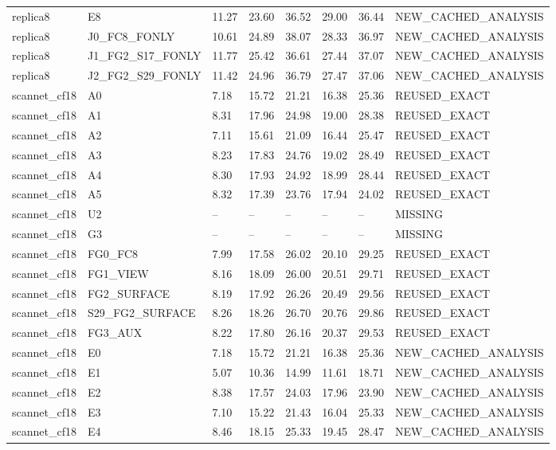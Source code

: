 \begin{tabular}{llllllll}
replica8 & E8 & 11.27 & 23.60 & 36.52 & 29.00 & 36.44 & NEW\_CACHED\_ANALYSIS \\
replica8 & J0\_FC8\_FONLY & 10.61 & 24.89 & 38.07 & 28.33 & 36.97 & NEW\_CACHED\_ANALYSIS \\
replica8 & J1\_FG2\_S17\_FONLY & 11.77 & 25.42 & 36.61 & 27.44 & 37.07 & NEW\_CACHED\_ANALYSIS \\
replica8 & J2\_FG2\_S29\_FONLY & 11.42 & 24.96 & 36.79 & 27.47 & 37.06 & NEW\_CACHED\_ANALYSIS \\
scannet\_cf18 & A0 & 7.18 & 15.72 & 21.21 & 16.38 & 25.36 & REUSED\_EXACT \\
scannet\_cf18 & A1 & 8.31 & 17.96 & 24.98 & 19.00 & 28.38 & REUSED\_EXACT \\
scannet\_cf18 & A2 & 7.11 & 15.61 & 21.09 & 16.44 & 25.47 & REUSED\_EXACT \\
scannet\_cf18 & A3 & 8.23 & 17.83 & 24.76 & 19.02 & 28.49 & REUSED\_EXACT \\
scannet\_cf18 & A4 & 8.30 & 17.93 & 24.92 & 18.99 & 28.44 & REUSED\_EXACT \\
scannet\_cf18 & A5 & 8.32 & 17.39 & 23.76 & 17.94 & 24.02 & REUSED\_EXACT \\
scannet\_cf18 & U2 & -- & -- & -- & -- & -- & MISSING \\
scannet\_cf18 & G3 & -- & -- & -- & -- & -- & MISSING \\
scannet\_cf18 & FG0\_FC8 & 7.99 & 17.58 & 26.02 & 20.10 & 29.25 & REUSED\_EXACT \\
scannet\_cf18 & FG1\_VIEW & 8.16 & 18.09 & 26.00 & 20.51 & 29.71 & REUSED\_EXACT \\
scannet\_cf18 & FG2\_SURFACE & 8.19 & 17.92 & 26.26 & 20.49 & 29.56 & REUSED\_EXACT \\
scannet\_cf18 & S29\_FG2\_SURFACE & 8.26 & 18.26 & 26.70 & 20.76 & 29.86 & REUSED\_EXACT \\
scannet\_cf18 & FG3\_AUX & 8.22 & 17.80 & 26.16 & 20.37 & 29.53 & REUSED\_EXACT \\
scannet\_cf18 & E0 & 7.18 & 15.72 & 21.21 & 16.38 & 25.36 & NEW\_CACHED\_ANALYSIS \\
scannet\_cf18 & E1 & 5.07 & 10.36 & 14.99 & 11.61 & 18.71 & NEW\_CACHED\_ANALYSIS \\
scannet\_cf18 & E2 & 8.38 & 17.57 & 24.03 & 17.96 & 23.90 & NEW\_CACHED\_ANALYSIS \\
scannet\_cf18 & E3 & 7.10 & 15.22 & 21.43 & 16.04 & 25.33 & NEW\_CACHED\_ANALYSIS \\
scannet\_cf18 & E4 & 8.46 & 18.15 & 25.33 & 19.45 & 28.47 & NEW\_CACHED\_ANALYSIS \\

\end{tabular}
